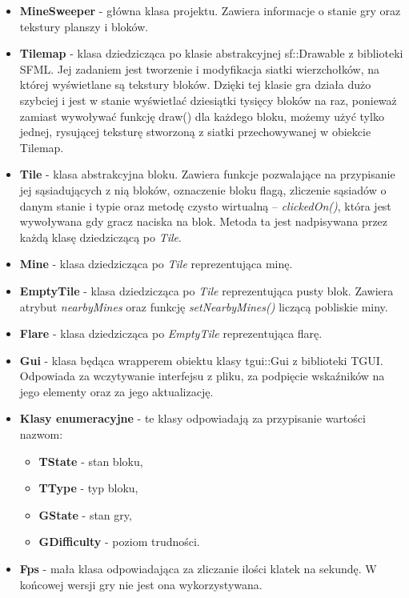 \documentclass[12pt,a4paper]{article}
\begin{document}
\begin{itemize}
\item \textbf{MineSweeper} - główna klasa projektu. Zawiera informacje o stanie gry oraz tekstury planszy i bloków.

\item \textbf{Tilemap} - klasa dziedzicząca po klasie abstrakcyjnej sf::Drawable z biblioteki SFML. Jej zadaniem jest tworzenie i modyfikacja siatki wierzchołków, na której wyświetlane są tekstury bloków. Dzięki tej klasie gra działa dużo szybciej i jest w stanie wyświetlać dziesiątki tysięcy bloków na raz, ponieważ zamiast wywoływać funkcję draw() dla każdego bloku, możemy użyć tylko jednej, rysującej teksturę stworzoną z siatki przechowywanej w obiekcie Tilemap.

\item \textbf{Tile} - klasa abstrakcyjna bloku. Zawiera funkcje pozwalające na przypisanie jej sąsiadujących z nią bloków, oznaczenie bloku flagą, zliczenie sąsiadów o danym stanie i typie oraz metodę czysto wirtualną -- \textit{clickedOn()}, która jest wywoływana gdy gracz naciska na blok. Metoda ta jest nadpisywana przez każdą klasę dziedziczącą po \textit{Tile}.

\item \textbf{Mine} - klasa dziedzicząca po \textit{Tile} reprezentująca minę.

\item \textbf{EmptyTile} - klasa dziedzicząca po \textit{Tile} reprezentująca pusty blok. Zawiera atrybut \textit{nearbyMines} oraz funkcję \textit{setNearbyMines()} liczącą pobliskie miny.
\item \textbf{Flare} - klasa dziedzicząca po \textit{EmptyTile} reprezentująca flarę.

\item \textbf{Gui} - klasa będąca wrapperem obiektu klasy tgui::Gui z biblioteki TGUI. Odpowiada za wczytywanie interfejsu z pliku, za podpięcie wskaźników na jego elementy oraz za jego aktualizację.

\item \textbf{Klasy enumeracyjne} - te klasy odpowiadają za przypisanie wartości nazwom:
\begin{itemize}
\item \textbf{TState} - stan bloku,
\item \textbf{TType} - typ bloku,
\item \textbf{GState} - stan gry,
\item \textbf{GDifficulty} - poziom trudności.
\end{itemize}

\item \textbf{Fps} - mała klasa odpowiadająca za zliczanie ilości klatek na sekundę. W końcowej wersji gry nie jest ona wykorzystywana.

\end{itemize}
\end{document}
